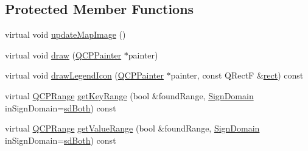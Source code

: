 \subsection*{Protected Member Functions}
\begin{DoxyCompactItemize}
\item 
virtual void \hyperlink{class_q_c_p_color_map_a5efcea591bb5486d968af520a4d43c3a}{update\+Map\+Image} ()
\item 
virtual void \hyperlink{class_q_c_p_color_map_a3b0f45a3177be9522d5e9b8cd8ae122d}{draw} (\hyperlink{class_q_c_p_painter}{Q\+C\+P\+Painter} $\ast$painter)
\item 
virtual void \hyperlink{class_q_c_p_color_map_a7d5eee89f6b8eaf2f11f1d94e32215b2}{draw\+Legend\+Icon} (\hyperlink{class_q_c_p_painter}{Q\+C\+P\+Painter} $\ast$painter, const Q\+Rect\+F \&\hyperlink{_gen_blob_8m_aea8f6815d9a63491fc422c5572c6b3c3}{rect}) const 
\item 
virtual \hyperlink{class_q_c_p_range}{Q\+C\+P\+Range} \hyperlink{class_q_c_p_color_map_a0d89371f8707f12e22737b863f1a5126}{get\+Key\+Range} (bool \&found\+Range, \hyperlink{class_q_c_p_abstract_plottable_a661743478a1d3c09d28ec2711d7653d8}{Sign\+Domain} in\+Sign\+Domain=\hyperlink{class_q_c_p_abstract_plottable_a661743478a1d3c09d28ec2711d7653d8a082b98cfb91a7363a3b5cd17b0c1cd60}{sd\+Both}) const 
\item 
virtual \hyperlink{class_q_c_p_range}{Q\+C\+P\+Range} \hyperlink{class_q_c_p_color_map_ac1b906e05ca9b61680e61b74b3825a22}{get\+Value\+Range} (bool \&found\+Range, \hyperlink{class_q_c_p_abstract_plottable_a661743478a1d3c09d28ec2711d7653d8}{Sign\+Domain} in\+Sign\+Domain=\hyperlink{class_q_c_p_abstract_plottable_a661743478a1d3c09d28ec2711d7653d8a082b98cfb91a7363a3b5cd17b0c1cd60}{sd\+Both}) const 
\end{DoxyCompactItemize}
